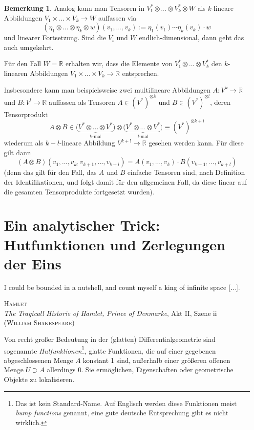 \documentclass[a4paper]{scrreprt}
\numberwithin{equation}{chapter}
\newcommand{\R}{\mathbb{R}}
\theoremstyle{definition}
\newtheorem{bem}[defn]{Bemerkung}
\begin{document}
\begin{bem}
	Analog kann man Tensoren in $V_1^* \otimes \dots \otimes V_k^* \otimes W$ als $k$-lineare Abbildungen $V_1 \times \dots \times V_k \to W$ auffassen via
	\[(\eta_1 \otimes \dots \otimes \eta_k \otimes w)(v_1, \dots, v_k) := \eta_1(v_1) \cdots \eta_k(v_k) \cdot w\]
	und linearer Fortsetzung. Sind die $V_i$ und $W$ endlich-dimensional, dann geht das auch umgekehrt.

	Für den Fall $W = \R$ erhalten wir, dass die Elemente von $V_1^* \otimes \dots \otimes V_k^*$ den $k$-linearen Abbildungen $V_1 \times \dots \times V_k \to \R$ entsprechen.

	Insbesondere kann man beispielsweise zwei multilineare Abbildungen $A\colon V^k \to \R$ und $B\colon V^l \to \R$ auffassen als Tensoren $A \in (V^*)^{\otimes k}$ und $B \in (V^*)^{\otimes l}$, deren Tensorprodukt
	\[A\otimes B \in \big(\underbrace{V^*\otimes \dots \otimes V^*}_\text{$k$-mal}\big) \otimes \big(\underbrace{V^*\otimes \dots \otimes V^*}_\text{$l$-mal}\big) \equiv (V^*)^{\otimes {k+l}}\]
	wiederum als $k+l$-lineare Abbildung $V^{k+l} \to \R$ gesehen werden kann. Für diese gilt dann
	\[(A\otimes B)(v_1,\dots,v_k, v_{k+1},\dots,v_{k+l}) = A(v_1,\dots,v_k) \cdot B(v_{k+1},\dots,v_{k+l})\]
	(denn das gilt für den Fall, das $A$ und $B$ einfache Tensoren sind, nach Definition der Identifikationen, und folgt damit für den allgemeinen Fall, da diese linear auf die gesamten Tensorprodukte fortgesetzt wurden).
\end{bem}


\chapter{Ein analytischer Trick: Hutfunktionen und Zerlegungen der Eins}
\epigraph{I could be bounded in a nutshell, and count myself a king of infinite space [$\ldots$].}{\textsc{Hamlet}\\\emph{The Tragicall Historie of Hamlet, Prince of Denmarke}, Akt II, Szene ii\\(\textsc{William Shakespeare})}

Von recht großer Bedeutung in der (glatten) Differentialgeometrie sind sogenannte \emph{Hutfunktionen}\footnote{Das ist kein Standard-Name. Auf Englisch werden diese Funktionen meist \emph{bump functions}  genannt, eine gute deutsche Entsprechung gibt es nicht wirklich.}, glatte Funktionen, die auf einer gegebenen abgeschlossenen Menge $A$ konstant 1 sind, außerhalb einer größeren offenen Menge $U \supset A$ allerdings 0. Sie ermöglichen, Eigenschaften oder geometrische Objekte zu \glqq lokalisieren\grqq.
\end{document}
